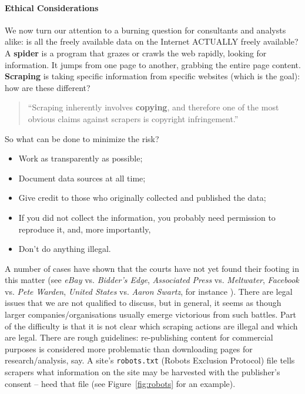 \paragraph{Ethical Considerations} We now turn our attention to a burning question for consultants and analysts alike: is all the freely available data on the Internet ACTUALLY freely available? 
\newl A \textbf{spider} is a program that grazes or crawls the web rapidly, looking for information. It jumps from one page to another, grabbing the entire page content. \textbf{Scraping} is taking specific information from specific websites (which is the goal): how are these different? 
\begin{quote}``Scraping inherently involves \textbf{copying}, and therefore one of the most obvious claims against scrapers is copyright infringement.'' \cite{DC_MRMN}\end{quote}
So what can be done to minimize the risk? 
\begin{itemize}[noitemsep]
\item Work as transparently as possible;
\item Document data sources at all time;
\item Give credit to those who originally collected and published the data;
\item If you did not collect the information, you probably need permission to reproduce it, and, more importantly, 
\item Don't do anything illegal.
\end{itemize}
A number of  cases have shown that the courts have not yet found their footing in this matter  (see \textit{eBay} vs. \textit{Bidder's Edge}, \textit{Associated Press} vs. \textit{Meltwater}, \textit{Facebook} vs. \textit{Pete Warden}, \textit{United States} vs. \textit{Aaron Swartz}, for instance \cite{DC_M}). There are legal issues that we are not qualified to discuss, but in general, it seems as though larger companies/organisations usually emerge victorious from such battles. \newl Part of the difficulty is that it is not clear which scraping actions are illegal and which are legal. There are rough guidelines: re-publishing content for commercial purposes is considered more problematic than downloading pages for research/analysis, say. A site's  \texttt{robots.txt} (Robots Exclusion Protocol) file tells scrapers what information on the site may be harvested with the publisher's consent -- heed that file (see Figure~\ref{fig:robots} for an example).
